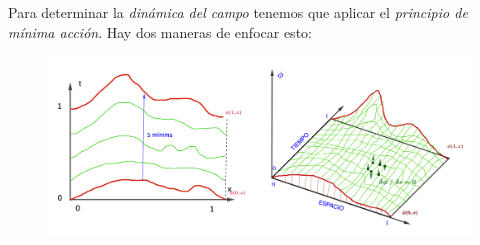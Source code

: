 Para determinar la \emph{dinámica del campo} tenemos que aplicar el \emph{principio de mínima acción}. Hay dos maneras de enfocar esto:

\begin{figure}[H]
	\centering
	\includegraphics[width=1\textwidth]{imagenes/img29-03.png}
\end{figure}



